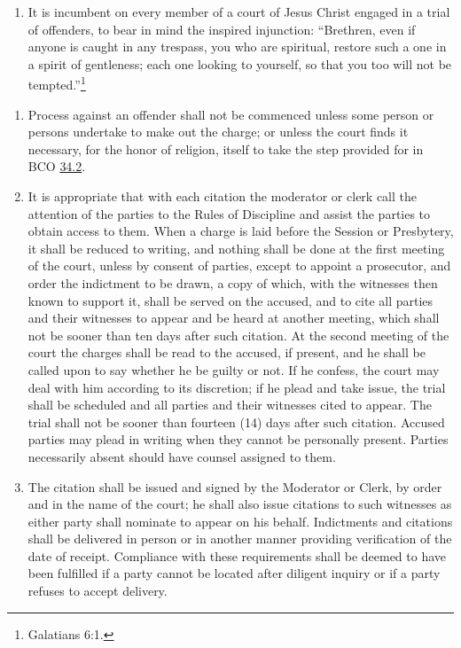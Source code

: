 \documentclass[
]{book}
\providecommand{\tightlist}{%
  \setlength{\itemsep}{0pt}\setlength{\parskip}{0pt}}
\begin{document}
\protect\hypertarget{chapter-slug-35-general-provisions-applicable-to-all-cases-of-process}{\href{}{}}

\begin{enumerate}
\def\labelenumi{\arabic{enumi}.}
\tightlist
\item
  \protect\hypertarget{35}{\href{}{}}It is incumbent on every member of a court of Jesus Christ engaged in a trial of offenders, to bear in mind the inspired injunction: ``Brethren, even if anyone is caught in any trespass, you who are spiritual, restore such a one in a spirit of gentleness; each one looking to yourself, so that you too will not be tempted.''\footnote{Galatians 6:1.}
\end{enumerate}

\begin{enumerate}
\def\labelenumi{\arabic{enumi}.}
\setcounter{enumi}{1}
\tightlist
\item
  Process against an offender shall not be commenced unless some person or persons undertake to make out the charge; or unless the court finds it necessary, for the honor of religion, itself to take the step provided for in BCO \protect\hyperlink{34.2}{34.2}.
\item
  It is appropriate that with each citation the moderator or clerk call the attention of the parties to the Rules of Discipline and assist the parties to obtain access to them. When a charge is laid before the Session or Presbytery, it shall be reduced to writing, and nothing shall be done at the first meeting of the court, unless by consent of parties, except to appoint a prosecutor, and order the indictment to be drawn, a copy of which, with the witnesses then known to support it, shall be served on the accused, and to cite all parties and their witnesses to appear and be heard at another meeting, which shall not be sooner than ten days after such citation. At the second meeting of the court the charges shall be read to the accused, if present, and he shall be called upon to say whether he be guilty or not. If he confess, the court may deal with him according to its discretion; if he plead and take issue, the trial shall be scheduled and all parties and their witnesses cited to appear. The trial shall not be sooner than fourteen (14) days after such citation. Accused parties may plead in writing when they cannot be personally present. Parties necessarily absent should have counsel assigned to them.
\item
  The citation shall be issued and signed by the Moderator or Clerk, by order and in the name of the court; he shall also issue citations to such witnesses as either party shall nominate to appear on his behalf. Indictments and citations shall be delivered in person or in another manner providing verification of the date of receipt. Compliance with these requirements shall be deemed to have been fulfilled if a party cannot be located after diligent inquiry or if a party refuses to accept delivery.

\end{enumerate}
\end{document}
